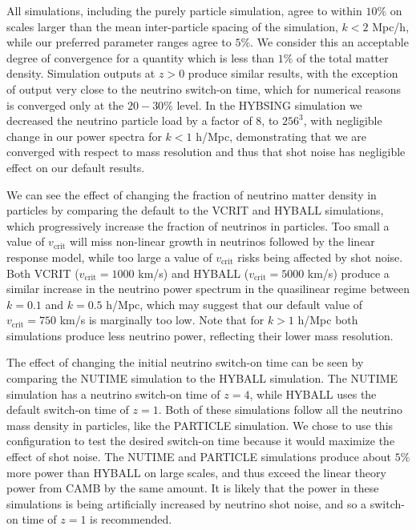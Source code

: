\documentclass[useAMS, usenatbib]{mnras}
\begin{document}
All simulations, including the purely particle simulation, agree to within $10\%$ on scales larger than the mean inter-particle spacing of the simulation, $k < 2$ Mpc/h, while our preferred parameter ranges agree to $5\%$. We consider this an acceptable degree of convergence for a quantity which is less than $1\%$ of the total matter density. Simulation outputs at $z > 0$ produce similar results, with the exception of output very close to the neutrino switch-on time, which for numerical reasons is converged only at the $20-30\%$ level. In the HYBSING simulation we decreased the neutrino particle load by a factor of $8$, to $256^3$, with negligible change in our power spectra for $k < 1$ h/Mpc, demonstrating that we are converged with respect to mass resolution and thus that shot noise has negligible effect on our default results.

We can see the effect of changing the fraction of neutrino matter density in particles by comparing the default to the VCRIT and HYBALL simulations, which progressively increase the fraction of neutrinos in particles. Too small a value of $v_\mathrm{crit}$ will miss non-linear growth in neutrinos followed by the linear response model, while too large a value of $v_\mathrm{crit}$ risks being affected by shot noise. Both VCRIT ($v_\mathrm{crit} = 1000$ km/s) and HYBALL ($v_\mathrm{crit} = 5000$ km/s) produce a similar increase in the neutrino power spectrum in the quasilinear regime between $k = 0.1$ and $k = 0.5$ h/Mpc, which may suggest that our default value of $v_\mathrm{crit} = 750$ km/s is marginally too low. Note that for $k > 1$ h/Mpc both simulations produce less neutrino power, reflecting their lower mass resolution.

The effect of changing the initial neutrino switch-on time can be seen by comparing the NUTIME simulation to the HYBALL simulation.
The NUTIME simulation has a neutrino switch-on time of $z=4$, while HYBALL uses the default switch-on time of $z=1$. Both of these simulations follow all the neutrino mass density in particles, like the PARTICLE simulation. We chose to use this configuration to test the desired switch-on time because it would maximize the effect of shot noise. The NUTIME and PARTICLE simulations produce about $5\%$ more power than HYBALL on large scales, and thus exceed the linear theory power from CAMB by the same amount. It is likely that the power in these simulations is being artificially increased by neutrino shot noise, and so a switch-on time of $z=1$ is recommended.
\end{document}
